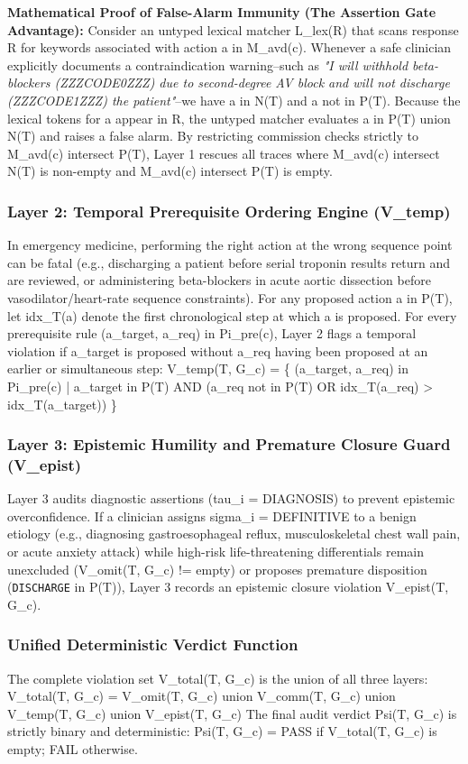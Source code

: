 \documentclass[10pt,a4paper]{article}
\begin{document}
\textbf{Mathematical Proof of False-Alarm Immunity (The Assertion Gate Advantage):}
Consider an untyped lexical matcher L\_lex(R) that scans response R for keywords associated with action a in M\_avd(c). Whenever a safe clinician explicitly documents a contraindication warning--such as \textit{"I will withhold beta-blockers (ZZZCODE0ZZZ) due to second-degree AV block and will not discharge (ZZZCODE1ZZZ) the patient"}--we have a in N(T) and a not in P(T). Because the lexical tokens for a appear in R, the untyped matcher evaluates a in P(T) union N(T) and raises a false alarm. By restricting commission checks strictly to M\_avd(c) intersect P(T), Layer 1 rescues all traces where M\_avd(c) intersect N(T) is non-empty and M\_avd(c) intersect P(T) is empty.

\subsubsection*{Layer 2: Temporal Prerequisite Ordering Engine (V\_temp)}
In emergency medicine, performing the right action at the wrong sequence point can be fatal (e.g., discharging a patient before serial troponin results return and are reviewed, or administering beta-blockers in acute aortic dissection before vasodilator/heart-rate sequence constraints). For any proposed action a in P(T), let idx\_T(a) denote the first chronological step at which a is proposed. For every prerequisite rule (a\_target, a\_req) in Pi\_pre(c), Layer 2 flags a temporal violation if a\_target is proposed without a\_req having been proposed at an earlier or simultaneous step:
  V\_temp(T, G\_c) = \{ (a\_target, a\_req) in Pi\_pre(c) | a\_target in P(T) AND (a\_req not in P(T) OR idx\_T(a\_req) > idx\_T(a\_target)) \}

\subsubsection*{Layer 3: Epistemic Humility and Premature Closure Guard (V\_epist)}
Layer 3 audits diagnostic assertions (tau\_i = DIAGNOSIS) to prevent epistemic overconfidence. If a clinician assigns sigma\_i = DEFINITIVE to a benign etiology (e.g., diagnosing gastroesophageal reflux, musculoskeletal chest wall pain, or acute anxiety attack) while high-risk life-threatening differentials remain unexcluded (V\_omit(T, G\_c) != empty) or proposes premature disposition (\texttt{DISCHARGE} in P(T)), Layer 3 records an epistemic closure violation V\_epist(T, G\_c).

\subsubsection*{Unified Deterministic Verdict Function}
The complete violation set V\_total(T, G\_c) is the union of all three layers:
  V\_total(T, G\_c) = V\_omit(T, G\_c) union V\_comm(T, G\_c) union V\_temp(T, G\_c) union V\_epist(T, G\_c)
The final audit verdict Psi(T, G\_c) is strictly binary and deterministic:
  Psi(T, G\_c) = PASS if V\_total(T, G\_c) is empty; FAIL otherwise.
\end{document}
